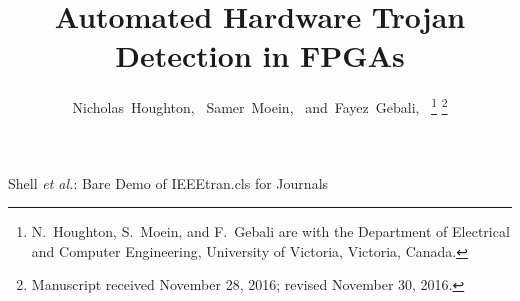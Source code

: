 \documentclass[journal, hidelinks]{IEEEtran}
\begin{document}
\DeclarePairedDelimiter\ceil{\lceil}{\rceil}
\DeclarePairedDelimiter\floor{\lfloor}{\rfloor}
%
\title{Automated Hardware Trojan Detection in FPGAs}
%
%
%

\author{Nicholas~Houghton,~
	Samer~Moein,~
	and~Fayez~Gebali,~%
	\thanks{N.~Houghton, S.~Moein, and F.~Gebali are with the Department
		of Electrical and Computer Engineering, University of Victoria, Victoria, Canada.}
	\thanks{Manuscript received November 28, 2016; revised November 30, 2016.}}

% 
%



%
{Shell \MakeLowercase{\textit{et al.}}: Bare Demo of IEEEtran.cls for Journals}
% 
\end{document}

